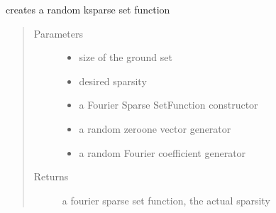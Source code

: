 \documentclass[letterpaper,10pt,english]{sphinxmanual}
\begin{document}
\begin{fulllineitems}
\label{\detokenize{setFTs:setFTs.setfunctions.createRandomSparse}}
\sphinxAtStartPar
creates a random k\sphinxhyphen{}sparse set function
\begin{quote}\begin{description}
\item[{Parameters}] \leavevmode\begin{itemize}
\item {} 
\sphinxAtStartPar
{} \textendash{} size of the ground set

\item {} 
\sphinxAtStartPar
{} \textendash{} desired sparsity

\item {} 
\sphinxAtStartPar
{} \textendash{} a Fourier Sparse SetFunction constructor

\item {} 
\sphinxAtStartPar
{} \textendash{} a random zero\sphinxhyphen{}one vector generator

\item {} 
\sphinxAtStartPar
{} \textendash{} a random Fourier coefficient generator

\end{itemize}

\item[{Returns}] \leavevmode
\sphinxAtStartPar
a fourier sparse set function, the actual sparsity

\end{description}\end{quote}

\end{fulllineitems}

\end{document}
